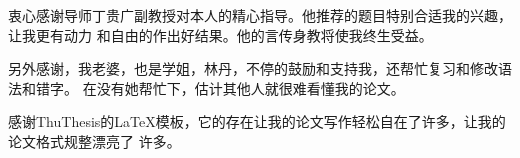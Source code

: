 \begin{acknowledgement}
  衷心感谢导师丁贵广副教授对本人的精心指导。他推荐的题目特别合适我的兴趣，让我更有动力
  和自由的作出好结果。他的言传身教将使我终生受益。

  另外感谢，我老婆，也是学姐，林丹，不停的鼓励和支持我，还帮忙复习和修改语法和错字。
  在没有她帮忙下，估计其他人就很难看懂我的论文。

  感谢ThuThesis的LaTeX模板，它的存在让我的论文写作轻松自在了许多，让我的论文格式规整漂亮了
  许多。
\end{acknowledgement}
